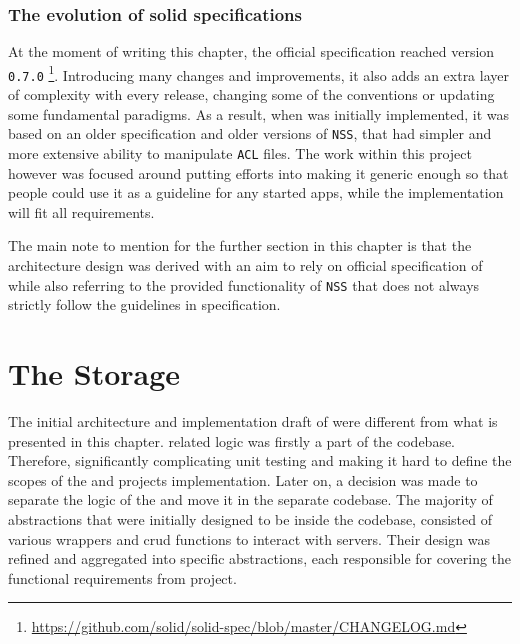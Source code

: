 \subsubsection{The evolution of solid specifications}
At the moment of writing this chapter, the official \solid{} specification reached version \texttt{0.7.0} \footnote{\url{https://github.com/solid/solid-spec/blob/master/CHANGELOG.md}}. Introducing many changes and improvements, it also adds an extra layer of complexity with every release, changing some of the conventions or updating some fundamental paradigms. As a result, when \lpa{} was initially implemented, it was based on an older specification and older versions of  \texttt{NSS}, that had simpler and more extensive ability to manipulate \texttt{ACL} files. The work within this project however was focused around putting efforts into making it generic enough so that people could use it as a guideline for any started \solid{} apps, while the implementation will fit all \lpa{} requirements.

The main note to mention for the further section in this chapter is that the architecture design was derived with an aim to rely on official specification of \solid{} while also referring to the provided functionality of \texttt{NSS} that does not always strictly follow the guidelines in specification. 


\section{The Storage}

The initial architecture and implementation draft of \lpas{} were different from what is presented in this chapter.  \solid{} related logic was firstly a part of the \lpa{} codebase. Therefore, significantly complicating unit testing and making it hard to define the scopes of the \lpa{} and \lpas{} projects implementation. Later on, a decision was made to separate the logic of the \lpas{} and move it in the separate codebase. The majority of abstractions that were initially designed to be inside the \lpa{} codebase, consisted of various wrappers and crud functions to interact with \solid{} servers. Their design was refined and aggregated into specific abstractions, each responsible for covering the functional requirements from \lpa{} project.


